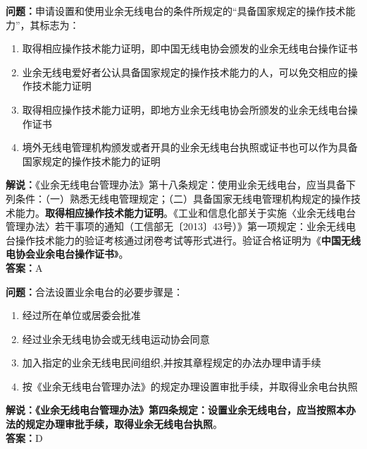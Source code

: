 \documentclass{ctexbook}
\begin{document}
\noindent\textbf{问题：}申请设置和使用业余无线电台的条件所规定的“具备国家规定的操作技术能力”，其标志为：
\begin{enumerate}[label=\Alph*), leftmargin=3em]
	\item 取得相应操作技术能力证明，即中国无线电协会颁发的业余无线电台操作证书
	\item 业余无线电爱好者公认具备国家规定的操作技术能力的人，可以免交相应的操作技术能力证明
	\item 取得相应操作技术能力证明，即地方业余无线电协会所颁发的业余无线电台操作证书
	\item 境外无线电管理机构颁发或者开具的业余无线电台执照或证书也可以作为具备国家规定的操作技术能力的证明
\end{enumerate}
\noindent\textbf{解说：}《业余无线电台管理办法》第十八条规定：使用业余无线电台，应当具备下列条件：（一）熟悉无线电管理规定；（二）具备国家无线电管理机构规定的操作技术能力。\textbf{取得相应操作技术能力证明}。《工业和信息化部关于实施〈业余无线电台管理办法〉若干事项的通知（工信部无〔2013〕43号）》第一项规定：业余无线电台操作技术能力的验证考核通过闭卷考试等形式进行。验证合格证明为《\textbf{中国无线电协会业余电台操作证书}》。\\\noindent\textbf{答案：}A


\bigskip


\noindent\textbf{问题：}合法设置业余电台的必要步骤是：
\begin{enumerate}[label=\Alph*), leftmargin=3em]	
	\item 经过所在单位或居委会批准
	\item 经过业余无线电协会或无线电运动协会同意
	\item 加入指定的业余无线电民间组织,并按其章程规定的办法办理申请手续
	\item 按《业余无线电台管理办法》的规定办理设置审批手续，并取得业余电台执照
\end{enumerate}
\noindent\textbf{解说：}\textbf{《业余无线电台管理办法》第四条规定：设置业余无线电台，应当按照本办法的规定办理审批手续，取得业余无线电台执照}。\\\noindent\textbf{答案：}D


\bigskip
\end{document}
